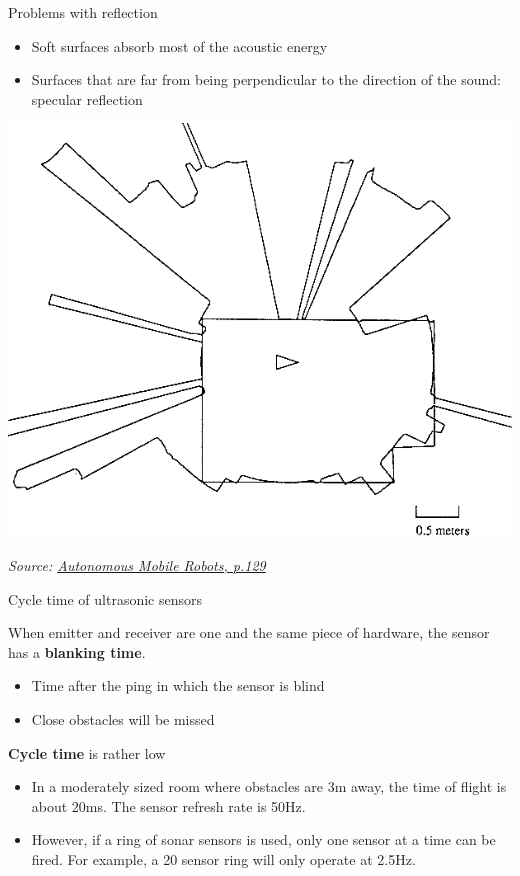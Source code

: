 \documentclass[compress]{beamer}
\newcommand{\source}[2]{{\tiny\it Source: \href{#1}{#2}}}
\begin{document}
\begin{frame}{Problems with reflection}

    \begin{itemize}

        \item Soft surfaces absorb most of the acoustic energy
        \item Surfaces that are far from being perpendicular to the direction of
              the sound: specular reflection
    \end{itemize}

    \begin{center}
        \includegraphics[width=0.6\linewidth]{us_scan}

        \source{https://books.google.co.uk/books?id=4of6AQAAQBAJ&pg=PA129}{Autonomous Mobile Robots, p.129}
    \end{center}
\end{frame}

\begin{frame}{Cycle time of ultrasonic sensors}

    When emitter and receiver are one and the same piece of hardware, the
    sensor has a \textbf{blanking time}.

    \begin{itemize}
        \item Time after the ping in which the sensor is blind
        \item Close obstacles will be missed
    \end{itemize}

    \textbf{Cycle time} is rather low

    \begin{itemize}
        \item In a moderately sized room where obstacles are 3m away, the time of
              flight is about 20ms. The sensor refresh rate is 50Hz.
        \item However, if a ring of sonar sensors is used, only one sensor at a time
              can be fired. For example, a 20 sensor ring will only operate at
              2.5Hz.
    \end{itemize}

\end{frame}
\end{document}
